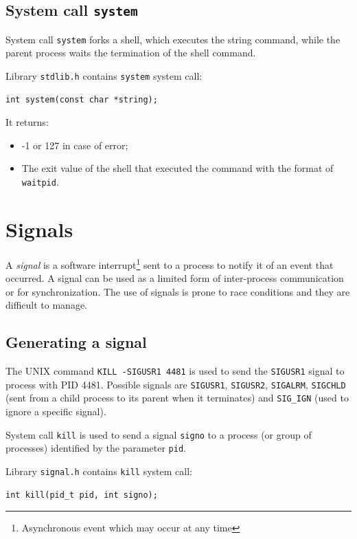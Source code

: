 \subsection{System call \texttt{system}}
System call \texttt{system} forks a shell, which executes the string command, while the parent process waits the termination of the shell command.

Library \texttt{stdlib.h} contains \texttt{system} system call:
\begin{verbatim}
int system(const char *string);
\end{verbatim}

It returns:
\begin{itemize}
\item -1 or 127 in case of error;
\item The exit value of the shell that executed the command with the format of \texttt{waitpid}.
\end{itemize}

\section{Signals}
A \emph{signal} is a software interrupt\footnote{Asynchronous event which may occur at any time} sent to a process to notify it of an event that occurred. A signal can be used as a limited form of inter-process communication or for synchronization. The use of signals is prone to race conditions and they are difficult to manage.

\subsection{Generating a signal}
The UNIX command \texttt{KILL -SIGUSR1 4481} is used to send the \texttt{SIGUSR1} signal to process with PID 4481. Possible signals are \texttt{SIGUSR1}, \texttt{SIGUSR2}, \texttt{SIGALRM}, \texttt{SIGCHLD} (sent from a child process to its parent when it terminates) and \texttt{SIG\_IGN} (used to ignore a specific signal).

System call \texttt{kill} is used to send a signal \texttt{signo} to a process (or group of processes) identified by the parameter \texttt{pid}.

Library \texttt{signal.h} contains \texttt{kill} system call:
\begin{verbatim}
int kill(pid_t pid, int signo);
\end{verbatim}


